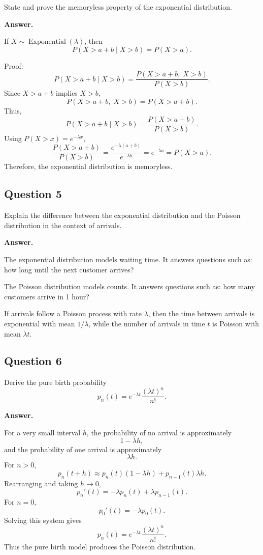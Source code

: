 \documentclass[12pt]{article}
\begin{document}
State and prove the memoryless property of the exponential distribution.

\textbf{Answer.}

If \(X\sim\operatorname{Exponential}(\lambda)\), then
\[
P(X>a+b\mid X>b)=P(X>a).
\]

Proof:
\[
P(X>a+b\mid X>b)
=
\frac{P(X>a+b,\;X>b)}{P(X>b)}.
\]
Since \(X>a+b\) implies \(X>b\),
\[
P(X>a+b,\;X>b)=P(X>a+b).
\]
Thus,
\[
P(X>a+b\mid X>b)
=
\frac{P(X>a+b)}{P(X>b)}.
\]
Using \(P(X>x)=e^{-\lambda x}\),
\[
\frac{P(X>a+b)}{P(X>b)}
=
\frac{e^{-\lambda(a+b)}}{e^{-\lambda b}}
=e^{-\lambda a}
=P(X>a).
\]
Therefore, the exponential distribution is memoryless.

\subsection*{Question 5}

Explain the difference between the exponential distribution and the Poisson distribution in the context of arrivals.

\textbf{Answer.}

The exponential distribution models waiting time. It answers questions such as: how long until the next customer arrives?

The Poisson distribution models counts. It answers questions such as: how many customers arrive in 1 hour?

If arrivals follow a Poisson process with rate \(\lambda\), then the time between arrivals is exponential with mean \(1/\lambda\), while the number of arrivals in time \(t\) is Poisson with mean \(\lambda t\).

\subsection*{Question 6}

Derive the pure birth probability
\[
p_n(t)=e^{-\lambda t}\frac{(\lambda t)^n}{n!}.
\]

\textbf{Answer.}

For a very small interval \(h\), the probability of no arrival is approximately
\[
1-\lambda h,
\]
and the probability of one arrival is approximately
\[
\lambda h.
\]
For \(n>0\),
\[
p_n(t+h)\approx p_n(t)(1-\lambda h)+p_{n-1}(t)\lambda h.
\]
Rearranging and taking \(h\to0\),
\[
p_n'(t)=-\lambda p_n(t)+\lambda p_{n-1}(t).
\]
For \(n=0\),
\[
p_0'(t)=-\lambda p_0(t).
\]
Solving this system gives
\[
p_n(t)=e^{-\lambda t}\frac{(\lambda t)^n}{n!}.
\]
Thus the pure birth model produces the Poisson distribution.
\end{document}
